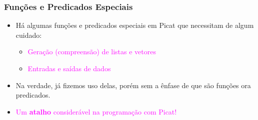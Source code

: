 \begin{frame}[fragile]

\frametitle{Funções e Predicados Especiais}
\begin{itemize}
    
    \item Há algumas funções e predicados especiais em Picat 
    que necessitam de algum cuidado:
    
    \pause
    \begin{itemize}
      \item \textcolor{magenta}{Geração (compreensão) de listas e vetores}
      \item  \textcolor{magenta}{Entradas e saídas de dados}
    \end{itemize}
    
    \pause
    \item Na verdade, já fizemos uso delas, porém sem a ênfase de que
    são funções ora predicados.
    
    \pause
    \item \textcolor{magenta}{Um \textbf{atalho} consider\'avel na programação com Picat!}
\end{itemize}
\end{frame}      


